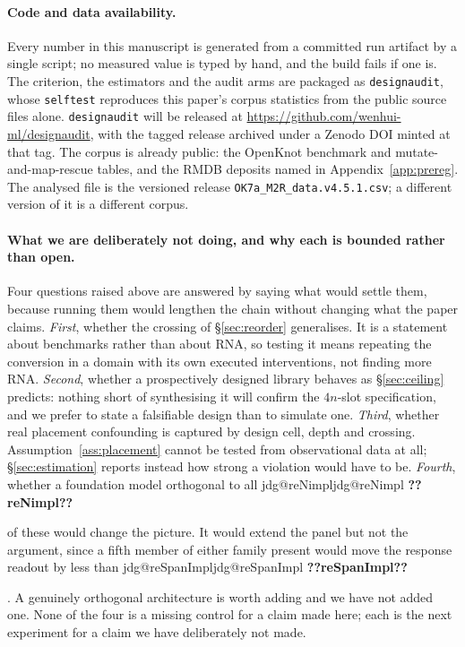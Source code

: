 \documentclass[11pt]{article}
\makeatletter
\newcommand{\jdg}[1]{%
  \ifcsname jdg@#1\endcsname\csname jdg@#1\endcsname
  \else\textbf{??#1??}\PackageError{nm}{undefined measured quantity #1}{}\fi}
\makeatother
\begin{document}
\paragraph{Code and data availability.} Every number in this manuscript is generated from a
committed run artifact by a single script; no measured value is typed by hand, and the build fails
if one is. The criterion, the estimators and the audit arms are packaged as \texttt{designaudit},
whose \texttt{selftest} reproduces this paper's corpus statistics from the public source files
alone. \texttt{designaudit} will be released at \url{https://github.com/wenhui-ml/designaudit}, with the tagged release archived under a Zenodo DOI minted at that tag. The corpus is already public: the OpenKnot benchmark and mutate-and-map-rescue tables, and the RMDB deposits named in Appendix~\ref{app:prereg}. The
analysed file is the versioned release \texttt{OK7a\_M2R\_data.v4.5.1.csv}; a different version of
it is a different corpus.

\paragraph{What we are deliberately not doing, and why each is bounded rather than open.} Four
questions raised above are answered by saying what would settle them, because running them would
lengthen the chain without changing what the paper claims. \emph{First}, whether the crossing of
\S\ref{sec:reorder} generalises. It is a statement about benchmarks rather than about RNA, so
testing it means repeating the conversion in a domain with its own executed interventions, not
finding more RNA. \emph{Second}, whether a prospectively designed library behaves as
\S\ref{sec:ceiling} predicts: nothing short of synthesising it will confirm the $4n$-slot
specification, and we prefer to state a falsifiable design than to simulate one. \emph{Third},
whether real placement confounding is captured by design cell, depth and crossing.
Assumption~\ref{ass:placement} cannot be tested from observational data at all;
\S\ref{sec:estimation} reports instead how strong a violation would have to be. \emph{Fourth},
whether a foundation model orthogonal to all \jdg{reNimpl} of these would change the picture. It
would extend the panel but not the argument, since a fifth member of either family present would
move the response readout by less than \jdg{reSpanImpl}. A genuinely orthogonal architecture is
worth adding and we have not added one. None of the four is a missing control for a claim made
here; each is the next experiment for a claim we have deliberately not made.
\end{document}
